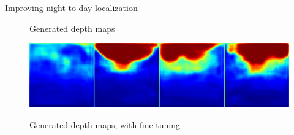 \begin{frame}{Improving night to day localization}
\begin{minipage}{0.7\linewidth}
\begin{figure}
\begin{minipage}{0.74\linewidth}
		\end{minipage}
		\begin{minipage}{0.21\linewidth}
			\raggedright \footnotesize
			Generated depth maps
		\end{minipage}
	\end{figure}
		\vspace{-0.5cm}
		\begin{figure}
			\centering
			\begin{minipage}{0.74\linewidth}
				\includegraphics[width=\linewidth]{im/res/night_ft}
			\end{minipage}
			\begin{minipage}{0.21\linewidth}
				\raggedright \footnotesize
				Generated depth maps, with fine tuning
			\end{minipage}
		\end{figure}
\end{minipage}
\end{frame}

